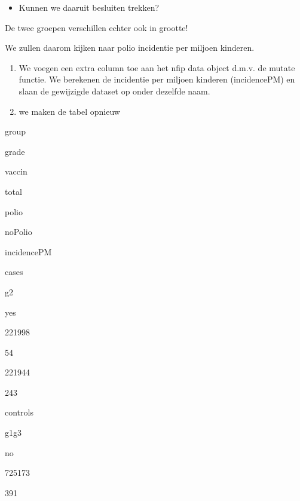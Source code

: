 \documentclass[
  12pt,dutch,coursenotes]{book}
\newenvironment{Shaded}{\begin{snugshade}}{\end{snugshade}}
\newcommand{\DataTypeTok}[1]{\textcolor[rgb]{0.13,0.29,0.53}{#1}}
\newcommand{\DecValTok}[1]{\textcolor[rgb]{0.00,0.00,0.81}{#1}}
\newcommand{\FloatTok}[1]{\textcolor[rgb]{0.00,0.00,0.81}{#1}}
\newcommand{\KeywordTok}[1]{\textcolor[rgb]{0.13,0.29,0.53}{\textbf{#1}}}
\newcommand{\NormalTok}[1]{#1}
\newcommand{\OperatorTok}[1]{\textcolor[rgb]{0.81,0.36,0.00}{\textbf{#1}}}
\newcommand{\StringTok}[1]{\textcolor[rgb]{0.31,0.60,0.02}{#1}}
\providecommand{\tightlist}{%
  \setlength{\itemsep}{0pt}\setlength{\parskip}{0pt}}
\theoremstyle{definition}
\theoremstyle{definition}
\theoremstyle{definition}
\theoremstyle{remark}
\begin{document}
\begin{itemize}
\tightlist
\item
  Kunnen we daaruit besluiten trekken?
\end{itemize}

De twee groepen verschillen echter ook in grootte!

We zullen daarom kijken naar polio incidentie per miljoen kinderen.

\begin{enumerate}
\def\labelenumi{\arabic{enumi}.}
\tightlist
\item
  We voegen een extra column toe aan het nfip data object d.m.v. de mutate functie. We berekenen de incidentie per miljoen kinderen (incidencePM) en slaan de gewijzigde dataset op onder dezelfde naam.
\item
  we maken de tabel opnieuw
\end{enumerate}

\begin{Shaded}
\end{Shaded}

group

grade

vaccin

total

polio

noPolio

incidencePM

cases

g2

yes

221998

54

221944

243

controls

g1g3

no

725173

391
\end{document}

